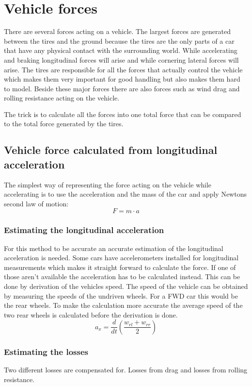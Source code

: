 \section{Vehicle forces}
There are several forces acting on a vehicle. The largest forces are generated between the tires and the ground because the tires are the only parts of a car that have any physical contact with the surrounding world. While accelerating and braking longitudinal forces will arise and while cornering lateral forces will arise. The tires are responsible for all the forces that actually control the vehicle which makes them very important for good handling but also makes them hard to model. Beside these major forces there are also forces such as wind drag and rolling resistance acting on the vehicle.

The trick is to calculate all the forces into one total force that can be compared to the total force generated by the tires.
\subsection{Vehicle force calculated from longitudinal acceleration}
The simplest way of representing the force acting on the vehicle while accelerating is to use the acceleration and the mass of the car and apply Newtons second law of motion:
\begin{equation}
	F = m \cdot a
\end{equation}
\subsubsection{Estimating the longitudinal acceleration}
\label{longaccest}
For this method to be accurate an accurate estimation of the longitudinal acceleration is needed. Some cars have accelerometers installed for longitudinal measurements which makes it straight forward to calculate the force. If one of those aren't available the acceleration has to be calculated instead. This can be done by derivation of the vehicles speed. The speed of the vehicle can be obtained by measuring the speeds of the undriven wheels. For a FWD car this would be the rear wheels. To make the calculation more accurate the average speed of the two rear wheels is calculated before the derivation is done.
\begin{equation}
a_{x} = \frac{d}{dt}(\frac{w_{rl}+w_{rr}}{2})
\end{equation}

\subsubsection{Estimating the losses}
Two different losses are compensated for. Losses from drag and losses from rolling resistance.

